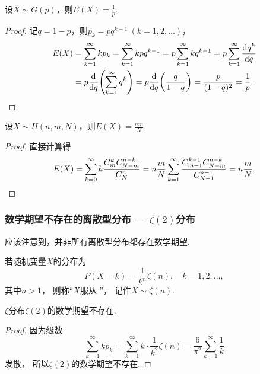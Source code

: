 \begin{proposition}\label{theorem:随机变量的数字特征.几何分布的数学期望}
设\(X \sim G(p)\)，则\(E(X) = \frac{1}{p}\).
\begin{proof}
记\(q = 1-p\)，则\(p_k = pq^{k-1}\ (k=1,2,\dotsc)\)，
\begin{align*}
	E(X)
	&= \sum_{k=1}^\infty k p_k
	= \sum_{k=1}^\infty k p q^{k-1}
	= p \sum_{k=1}^\infty k q^{k-1}
	= p \sum_{k=1}^\infty \dv{q^k}{q} \\
	&= p \dv{q}(\sum_{k=1}^\infty q^k)
	= p \dv{q}(\frac{q}{1-q})
	= \frac{p}{(1-q)^2}
	= \frac{1}{p}.
	\qedhere
\end{align*}
\end{proof}
\end{proposition}

\begin{proposition}\label{theorem:随机变量的数字特征.超几何分布的数学期望}
设\(X \sim H(n,m,N)\)，则\(E(X) = \frac{n m}{N}\).
\begin{proof}
直接计算得\[
	E(X)
	= \sum_{k=0}^\infty
		k \frac{C_m^k C_{N-m}^{n-k}}{C_N^n}
	= n \frac{m}{N}
		\sum_{k=1}^\infty
			\frac{C_{m-1}^{k-1} C_{N-m}^{n-k}}{C_{N-1}^{n-1}}
	= n \frac{m}{N}.
	\qedhere
\]
\end{proof}
\end{proposition}

\subsubsection{数学期望不存在的离散型分布 --- \texorpdfstring{\(\zeta(2)\)}{\textzeta(2)}分布}
应该注意到，并非所有离散型分布都存在数学期望.

\begin{definition}
若随机变量\(X\)的分布为\[
	P(X=k) = \frac{1}{k^n} \zeta(n),
	\quad k=1,2,\dotsc,
\]
其中\(n>1\)，
则称“\(X\)服从 ”，
记作\(X \sim \zeta(n)\).
\end{definition}

\begin{proposition}
\(\zeta\)分布\(\zeta(2)\)的数学期望不存在.
\begin{proof}
因为级数\[
	\sum_{k=1}^\infty k p_k
	= \sum_{k=1}^\infty k \cdot \frac{1}{k^2} \zeta(n)
	= \frac{6}{\pi^2} \sum_{k=1}^\infty \frac1k
\]发散，
所以\(\zeta(2)\)的数学期望不存在.
\end{proof}
\end{proposition}

